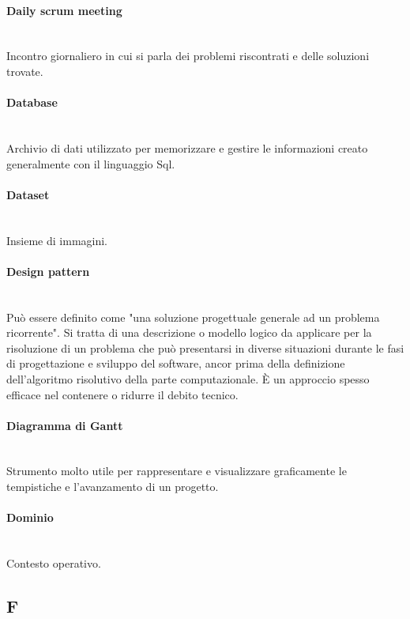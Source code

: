 \paragraph{Daily scrum meeting}~\smallskip \\
Incontro giornaliero in cui si parla dei problemi riscontrati e delle soluzioni trovate.

\paragraph{Database}~\smallskip \\
Archivio di dati utilizzato per memorizzare e gestire le informazioni creato generalmente con il linguaggio Sql.

\paragraph{Dataset}~\smallskip \\
Insieme di immagini.

\paragraph{Design pattern}~\smallskip \\
Può essere definito come "una soluzione progettuale generale ad un problema ricorrente".
Si tratta di una descrizione o modello logico da applicare per la risoluzione di un problema che può 
presentarsi in diverse situazioni durante le fasi di progettazione e sviluppo del software, ancor prima della definizione 
dell'algoritmo risolutivo della parte computazionale. È un approccio spesso efficace nel contenere o ridurre il debito tecnico.

\paragraph{Diagramma di Gantt}~\smallskip \\
Strumento molto utile per rappresentare e visualizzare graficamente le tempistiche e l'avanzamento di un progetto.

\paragraph{Dominio}~\smallskip \\
Contesto operativo.

\newpage
{}
\subsection*{F}


